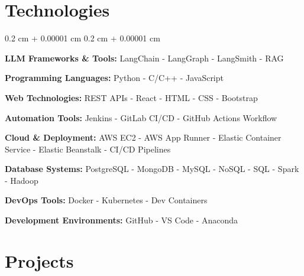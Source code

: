 \documentclass[10pt, letterpaper]{article}
\newenvironment{onecolentry}{
    \begin{adjustwidth}{
        0.2 cm + 0.00001 cm
    }{
        0.2 cm + 0.00001 cm
    }
}{
    \end{adjustwidth}
} %
\begin{document}
 \section{Technologies}
\vspace{-0.6cm}
\begin{onecolentry}
\item \textbf{LLM Frameworks \& Tools:} LangChain - LangGraph - LangSmith - RAG
\item \textbf{Programming Languages:} Python - C/C++ - JavaScript
\item \textbf{Web Technologies:} REST APIs - React - HTML - CSS - Bootstrap
\item \textbf{Automation Tools:} Jenkins - GitLab CI/CD - GitHub Actions Workflow
\item \textbf{Cloud \& Deployment:} AWS EC2 - AWS App Runner - Elastic Container Service - Elastic Beanstalk - CI/CD Pipelines
\item \textbf{Database Systems:} PostgreSQL - MongoDB - MySQL - NoSQL - SQL - Spark - Hadoop
\item \textbf{DevOps Tools:} Docker - Kubernetes - Dev Containers
\item \textbf{Development Environments:} GitHub - VS Code - Anaconda
\end{onecolentry}


\vspace{-.2cm}
    
\section{Projects}
\end{document}
